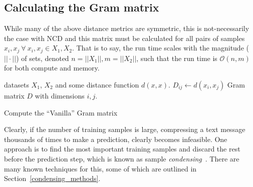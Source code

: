 \documentclass[conference]{IEEEtran}
\begin{document}
\subsection{Calculating the Gram matrix}
\label{gram_matrix}
While many of the above distance metrics are symmetric, this is not-necessarily the case with NCD and this matrix must be calculated for all pairs of samples $x_i, x_j~\forall~x_i,x_j \in X_1, X_2$. 
That is to say, the run time scales with the magnitude ($ || \cdot || $) of sets, denoted $n = || X_1 ||, m = || X_2 ||$, such that the run time is $\mathcal{O}(n,m)$ for both compute and memory.
\begin{algorithm}
    \begin{algorithmic}
        \Require datasets $X_1$, $X_2$ and some distance function $d(x,x)$.
                \State $D_{ij} \gets d(x_i, x_j)$
            \EndFor
        \EndFor
        \State \Return Gram matrix $D$ with dimensions $i,j$.
    \end{algorithmic}
    \caption{Compute the ``Vanilla'' Gram matrix}
    \label{alg:vanilla}
\end{algorithm}

Clearly, if the number of training samples is large, compressing a text message thousands of times to make a prediction, clearly becomes infeasible. 
One approach is to find the most important training samples and discard the rest before the prediction step, which is known as sample \textit{condensing}~\cite{}.
There are many known techniques for this, some of which are outlined in Section~\ref{condensing_methods}.
\end{document}
